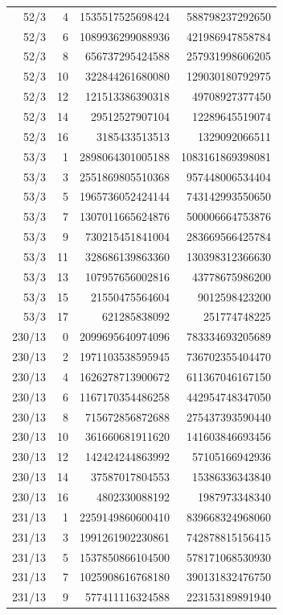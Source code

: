 \begin{longtable}{@{}rrrr@{}}
52/3 & 4 & 1535517525698424 & 588798237292650\\
52/3 & 6 & 1089936299088936 & 421986947858784\\
52/3 & 8 & 656737295424588 & 257931998606205\\
52/3 & 10 & 322844261680080 & 129030180792975\\
52/3 & 12 & 121513386390318 & 49708927377450\\
52/3 & 14 & 29512527907104 & 12289645519074\\
52/3 & 16 & 3185433513513 & 1329092066511\\
53/3 & 1 & 2898064301005188 & 1083161869398081\\
53/3 & 3 & 2551869805510368 & 957448006534404\\
53/3 & 5 & 1965736052424144 & 743142993550650\\
53/3 & 7 & 1307011665624876 & 500006664753876\\
53/3 & 9 & 730215451841004 & 283669566425784\\
53/3 & 11 & 328686139863360 & 130398312366630\\
53/3 & 13 & 107957656002816 & 43778675986200\\
53/3 & 15 & 21550475564604 & 9012598423200\\
53/3 & 17 & 621285838092 & 251774748225\\
230/13 & 0 & 2099695640974096 & 783334693205689\\
230/13 & 2 & 1971103538595945 & 736702355404470\\
230/13 & 4 & 1626278713900672 & 611367046167150\\
230/13 & 6 & 1167170354486258 & 442954748347050\\
230/13 & 8 & 715672856872688 & 275437393590440\\
230/13 & 10 & 361660681911620 & 141603846693456\\
230/13 & 12 & 142424244863992 & 57105166942936\\
230/13 & 14 & 37587017804553 & 15386336343840\\
230/13 & 16 & 4802330088192 & 1987973348340\\
231/13 & 1 & 2259149860600410 & 839668324968060\\
231/13 & 3 & 1991261902230861 & 742878815156415\\
231/13 & 5 & 1537850866104500 & 578171068530930\\
231/13 & 7 & 1025908616768180 & 390131832476750\\
231/13 & 9 & 577411116324588 & 223153189891940\\

\end{longtable}
